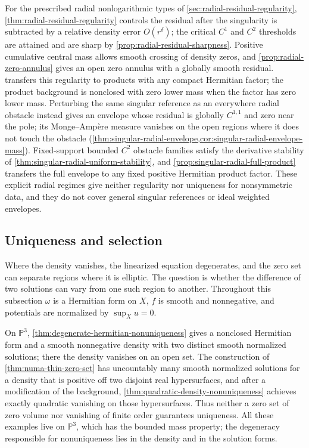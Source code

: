 For the prescribed radial nonlogarithmic types of \cref{sec:radial-residual-regularity}, \cref{thm:radial-residual-regularity} controls the residual after the singularity is subtracted by a relative density error $O(r^\delta)$; the critical $C^1$ and $C^2$ thresholds are attained and are sharp by \cref{prop:radial-residual-sharpness}. Positive cumulative central mass allows smooth crossing of density zeros, and \cref{prop:radial-zero-annulus} gives an open zero annulus with a globally smooth residual.  transfers this regularity to products with any compact Hermitian factor; the product background is nonclosed with zero lower mass when the factor has zero lower mass. Perturbing the same singular reference as an everywhere radial obstacle instead gives an envelope whose residual is globally $C^{1,1}$ and zero near the pole; its Monge--Amp\`ere measure vanishes on the open regions where it does not touch the obstacle (\cref{thm:singular-radial-envelope,cor:singular-radial-envelope-mass}). Fixed-support bounded $C^2$ obstacle families satisfy the derivative stability of \cref{thm:singular-radial-uniform-stability}, and \cref{prop:singular-radial-full-product} transfers the full envelope to any fixed positive Hermitian product factor. These explicit radial regimes give neither regularity nor uniqueness for nonsymmetric data, and they do not cover general singular references or ideal weighted envelopes.

\subsection{Uniqueness and selection}

Where the density vanishes, the linearized equation degenerates, and the zero set can separate regions where it is elliptic. The question is whether the difference of two solutions can vary from one such region to another. Throughout this subsection $\omega$ is a Hermitian form on $X$, $f$ is smooth and nonnegative, and potentials are normalized by $\sup_Xu=0$.

On $\mathbb P^3$, \cref{thm:degenerate-hermitian-nonuniqueness} gives a nonclosed Hermitian form and a smooth nonnegative density with two distinct smooth normalized solutions; there the density vanishes on an open set. The construction of \cref{thm:numa-thin-zero-set} has uncountably many smooth normalized solutions for a density that is positive off two disjoint real hypersurfaces, and after a modification of the background, \cref{thm:quadratic-density-nonuniqueness} achieves exactly quadratic vanishing on those hypersurfaces. Thus neither a zero set of zero volume nor vanishing of finite order guarantees uniqueness. All these examples live on $\mathbb P^3$, which has the bounded mass property; the degeneracy responsible for nonuniqueness lies in the density and in the solution forms.

